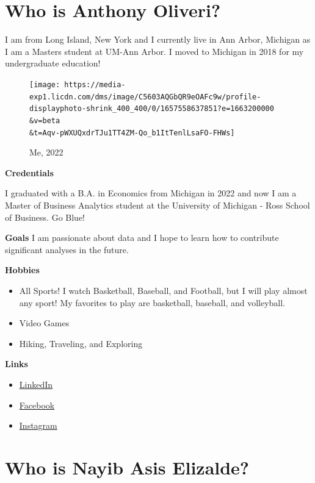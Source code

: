 \documentclass[
]{book}
\begin{document}
\hypertarget{who-is-anthony-oliveri}{%
\section{Who is Anthony Oliveri?}\label{who-is-anthony-oliveri}}

I am from Long Island, New York and I currently live in Ann Arbor, Michigan as I am a Masters student at UM-Ann Arbor. I moved to Michigan in 2018 for my undergraduate education!

\begin{figure}
\centering
\texttt{[image: https://media-exp1.licdn.com/dms/image/C5603AQGbQR9eOAFc9w/profile-displayphoto-shrink\_400\_400/0/1657558637851?e=1663200000\\\&v=beta\\\&t=Aqv-pWXUQxdrTJu1TT4ZM-Qo\_b1ItTenlLsaFO-FHWs]}
\caption{Me, 2022}
\end{figure}

\textbf{Credentials}

I graduated with a B.A. in Economics from Michigan in 2022 and now I am a Master of Business Analytics student at the University of Michigan - Ross School of Business. Go Blue!

\textbf{Goals}
I am passionate about data and I hope to learn how to contribute significant analyses in the future.

\textbf{Hobbies}

\begin{itemize}
\item
  All Sports! I watch Basketball, Baseball, and Football, but I will play almost any sport! My favorites to play are basketball, baseball, and volleyball.
\item
  Video Games
\item
  Hiking, Traveling, and Exploring
\end{itemize}

\textbf{Links}

\begin{itemize}
\item
  \href{https://www.linkedin.com/in/anthony-oliveri1/}{LinkedIn}
\item
  \href{https://www.facebook.com/anthony.oliveri.6/}{Facebook}
\item
  \href{https://www.instagram.com/aoliveri8/}{Instagram}
\end{itemize}

\hypertarget{who-is-nayib-asis-elizalde}{%
\section{Who is Nayib Asis Elizalde?}\label{who-is-nayib-asis-elizalde}}
\end{document}
